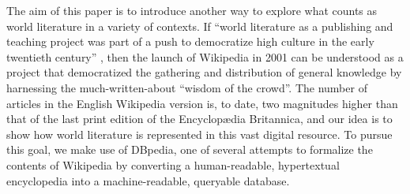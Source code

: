\documentclass[a4paper,12pt]{scrartcl}
\begin{document}
The aim of this paper is to introduce another way to explore what
counts as world literature in a variety of contexts.  If ``world
literature as a publishing and teaching project was part of a push to
democratize high culture in the early twentieth
century'' %
\cite{levine2013what}, then the launch of Wikipedia in 2001 can be
understood as a project that democratized the gathering and
distribution of general knowledge by harnessing the much-written-about
``wisdom of the crowd''. The number of articles in the English
Wikipedia version
is, to date, two magnitudes higher than that of the last print edition
of the Encyclopædia Britannica, and our idea is to show how world
literature is represented in this vast digital resource. To pursue
this goal, we make use of DBpedia, one of several attempts to
formalize the contents of Wikipedia by converting a human-readable,
hypertextual encyclopedia into a machine-readable, queryable
database.


\end{document}
